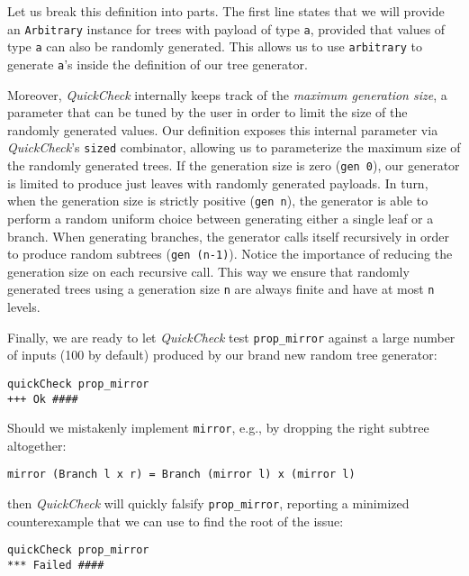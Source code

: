 \documentclass[acmsmall, anonymous]{acmart}
\newcommand{\quickcheck}{\textit{QuickCheck}\xspace}
\begin{document}
\noindent Let us break this definition into parts.
%
The first line states that we will provide an \texttt{Arbitrary} instance for
trees with payload of type \texttt{a}, provided that values of type \texttt{a}
can also be randomly generated.
%
This allows us to use \texttt{arbitrary} to generate \texttt{a}'s inside the
definition of our tree generator.


Moreover, \quickcheck internally keeps track of the \emph{maximum generation
  size}, a parameter that can be tuned by the user in order to limit the size of
the randomly generated values.
%
Our definition exposes this internal parameter via \quickcheck's \texttt{sized}
combinator, allowing us to parameterize the maximum size of the randomly
generated trees.
%
If the generation size is zero (\texttt{gen 0}), our generator is limited to
produce just leaves with randomly generated payloads.
%
In turn, when the generation size is strictly positive (\texttt{gen n}), the
generator is able to perform a random uniform choice between generating either a
single leaf or a branch.
%
When generating branches, the generator calls itself recursively in order to
produce random subtrees (\texttt{gen (n-1)}).
%
Notice the importance of reducing the generation size on each recursive call.
%
This way we ensure that randomly generated trees using a generation size
\texttt{n} are always finite and have at most \texttt{n} levels.

Finally, we are ready to let \quickcheck test \texttt{prop\_mirror} against a
large number of inputs (100 by default) produced by our brand new random tree
generator:

\begin{verbatim}
quickCheck prop_mirror
+++ Ok ####
\end{verbatim}

\noindent Should we mistakenly implement \texttt{mirror}, e.g., by dropping the
right subtree altogether:

\begin{verbatim}
mirror (Branch l x r) = Branch (mirror l) x (mirror l)
\end{verbatim}

\noindent then \quickcheck will quickly falsify \texttt{prop\_mirror}, reporting
a minimized counterexample that we can use to find the root of the issue:

\begin{verbatim}
quickCheck prop_mirror
*** Failed ####
\end{verbatim}
\end{document}
